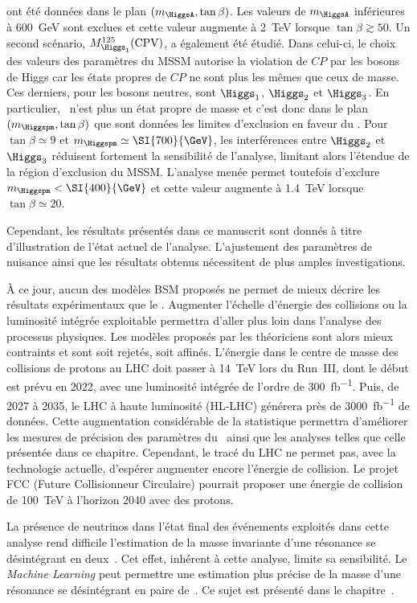ont été données
dans le plan
$(m_{\HiggsA},\tan\beta)$.
Les valeurs de $m_{\HiggsA}$ inférieures à \SI{600}{\GeV} sont exclues
et cette valeur augmente à \SI{2}{\TeV} lorsque $\tan\beta\gtrsim\num{50}$.
Un second scénario, $M_{\Higgs_1}^{125}(\text{CPV})$,
a également été étudié.
Dans celui-ci, le choix des valeurs des paramètres du MSSM
autorise la violation de $CP$ par les bosons de Higgs
car les états propres de $CP$ ne sont plus les mêmes que ceux de masse.
Ces derniers, pour les bosons neutres, sont
$\Higgs_1$, $\Higgs_2$ et $\Higgs_3$.
En particulier, \HiggsA\ n'est plus un état propre de masse et c'est donc
dans le plan $(m_{\Higgspm},\tan\beta)$ que sont données les limites d'exclusion en faveur du \SM.
Pour $\tan\beta\simeq\num{9}$ et $m_{\Higgspm}\simeq\SI{700}{\GeV}$,
les interférences entre $\Higgs_2$ et $\Higgs_3$ réduisent fortement la sensibilité de l'analyse,
limitant alors l'étendue de la région d'exclusion du MSSM.
L'analyse menée permet toutefois d'exclure $m_{\Higgspm} < \SI{400}{\GeV}$
et cette valeur augmente à \SI{1.4}{\TeV} lorsque $\tan\beta\simeq\num{20}$.
\par
Cependant,
les résultats présentés dans ce manuscrit sont donnés à titre d'illustration de l'état actuel de l'analyse.
L'ajustement des paramètres de nuisance ainsi que les résultats obtenus nécessitent de plus amples investigations.
\par
À ce jour,
aucun des modèles BSM proposés ne permet de mieux décrire les résultats expérimentaux que le \SM.
Augmenter l'échelle d'énergie des collisions ou la luminosité intégrée exploitable permettra d'aller plus loin dans l'analyse des processus physiques.
Les modèles proposés par les théoriciens sont alors mieux contraints et sont soit rejetés, soit affinés.
L'énergie dans le centre de masse des collisions de protons au LHC doit passer à \SI{14}{\TeV} lors du Run~III, dont le début est prévu en 2022, avec une luminosité intégrée de l'ordre de \SI{300}{\femto\barn^{-1}}.
Puis, de 2027 à 2035, le LHC à haute luminosité (HL-LHC) générera près de \SI{3000}{\femto\barn^{-1}} de données.
Cette augmentation considérable de la statistique
permettra d'améliorer les mesures de précision des paramètres du \SM\
ainsi que les analyses telles que celle présentée dans ce chapitre.
Cependant, le tracé du LHC ne permet pas, avec la technologie actuelle, d'espérer augmenter encore l'énergie de collision.
Le projet FCC (Future Collisionneur Circulaire) \cite{FCC} pourrait proposer une énergie de collision de \SI{100}{\TeV} à l'horizon 2040 avec des protons.
\par
La présence de neutrinos dans l'état final des événements exploités dans cette analyse
rend difficile l'estimation de la masse invariante d'une résonance se désintégrant en deux~\tau.
Cet effet, inhérent à cette analyse, limite sa sensibilité.
Le \emph{Machine Learning} peut permettre une estimation plus précise de la masse d'une résonance se désintégrant en paire de~\tau.
Ce sujet est présenté dans le chapitre~\refChML.